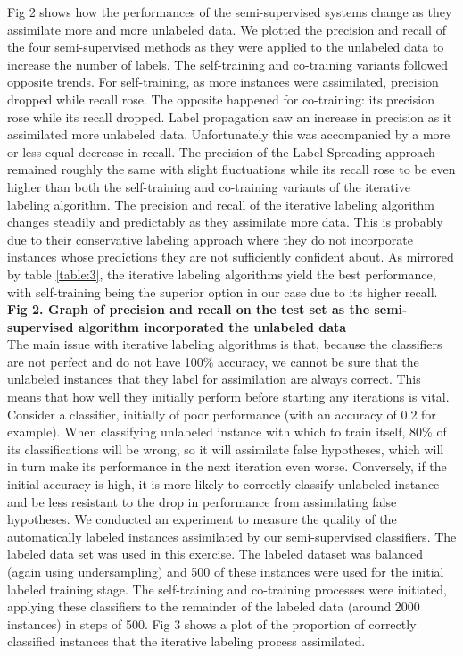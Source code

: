 \documentclass[10pt,letterpaper]{article}
\begin{document}
Fig 2 shows how the performances of the semi-supervised systems change as they assimilate more and more unlabeled data. We plotted the precision and recall of the four semi-supervised methods as they were applied to the unlabeled data to increase the number of labels. The self-training and co-training variants followed opposite trends. For self-training, as more instances were assimilated, precision dropped while recall rose. The opposite happened for co-training: its precision rose while its recall dropped. Label propagation saw an increase in precision as it assimilated more unlabeled data. Unfortunately this was accompanied by a more or less equal decrease in recall. The precision of the Label Spreading approach remained roughly the same with slight fluctuations while its recall rose to be even higher than both the self-training and co-training variants of the iterative labeling algorithm. The precision and recall of the iterative labeling algorithm changes steadily and predictably as they assimilate more data. This is probably due to their conservative labeling approach where they do not incorporate instances whose predictions they are not sufficiently confident about. As mirrored by table \ref{table:3}, the iterative labeling algorithms yield the best performance, with self-training being the superior option in our case due to its higher recall.\\ 
%
\textbf{Fig 2. Graph of precision and recall on the test set as the semi-supervised algorithm incorporated the unlabeled data}\\
%
The main issue with iterative labeling algorithms is that, because the classifiers are not perfect and do not have 100\% accuracy, we cannot be sure that the unlabeled instances that they label for assimilation are always correct. This means that how well they initially perform before starting any iterations is vital. Consider a classifier, initially of poor performance (with an accuracy of 0.2 for example). When classifying unlabeled instance with which to train itself, 80\% of its classifications will be wrong, so it will assimilate false hypotheses, which will in turn make its performance in the next iteration even worse. Conversely, if the initial accuracy is high, it is more likely to correctly classify unlabeled instance and be less resistant to the drop in performance from assimilating false hypotheses. We conducted an experiment to measure the quality of the automatically labeled instances assimilated by our semi-supervised classifiers. The labeled data set was used in this exercise. The labeled dataset was balanced (again using undersampling) and 500 of these instances were used for the initial labeled training stage. The self-training and co-training processes were initiated, applying these classifiers to the remainder of the labeled data (around 2000 instances) in steps of 500. Fig 3 shows a plot of the proportion of correctly classified instances that the iterative labeling process assimilated.
\end{document}
